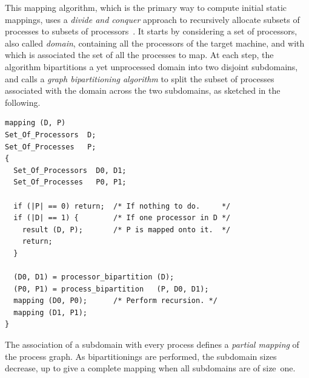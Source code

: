This mapping algorithm, which is the primary way to compute initial
static mappings, uses a \emph{divide and conquer\/} approach to
recursively allocate subsets of processes to subsets of
processors~\cite{pell94a,pero96b}. It starts by considering a set of
processors, also called \emph{domain}, containing all the processors of
the target machine, and with which is associated the set of all the
processes to map.  At each step, the algorithm bipartitions a yet
unprocessed domain into two disjoint subdomains, and calls a
\emph{graph bipartitioning algorithm\/} to split the subset of
processes associated with the domain across the two subdomains, as
sketched in the following.

\noi
{\renewcommand{\baselinestretch}{0.95}\footnotesize\tt {%
\begin{verbatim}
mapping (D, P)
Set_Of_Processors  D;
Set_Of_Processes   P;
{
  Set_Of_Processors  D0, D1;
  Set_Of_Processes   P0, P1;

  if (|P| == 0) return;  /* If nothing to do.     */
  if (|D| == 1) {        /* If one processor in D */
    result (D, P);       /* P is mapped onto it.  */
    return;
  }

  (D0, D1) = processor_bipartition (D);
  (P0, P1) = process_bipartition   (P, D0, D1);
  mapping (D0, P0);      /* Perform recursion. */
  mapping (D1, P1);
}
\end{verbatim}}}

\noi
The association of a subdomain with every process defines a \emph{partial
mapping\/} of the process graph. As bipartitionings are performed,
the subdomain sizes decrease, up to give a complete mapping when all
subdomains are of size~one.
\\

